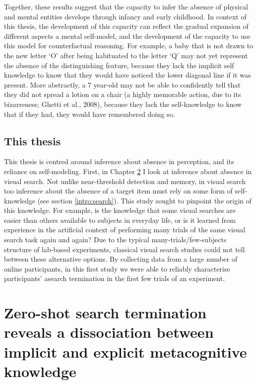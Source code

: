\documentclass[12pt,twoside]{reedthesis}
\begin{document}
Together, these results suggest that the capacity to infer the absence of physical and mental entities develops through infancy and early childhood. In context of this thesis, the development of this capacity can reflect the gradual expansion of different aspects a mental self-model, and the development of the capacity to use this model for counterfactual reasoning. For example, a baby that is not drawn to the new letter `O' after being habituated to the letter `Q' may not yet represent the absence of the distinguishing feature, because they lack the implicit self knowledge to know that they would have noticed the lower diagonal line if it was present. More abstractly, a 7 year-old may not be able to confidently tell that they did not spread a lotion on a chair (a highly memorable action, due to its bizarreness; Ghetti et al., 2008), because they lack the self-knowledge to know that if they had, they would have remembered doing so.

\hypertarget{this-thesis}{%
\section{This thesis}\label{this-thesis}}

This thesis is centred around inference about absence in perception, and its reliance on self-modeling. First, in Chapter \ref{ch:search} I look at inference about absence in visual search. Not unlike near-threshold detection and memory, in visual search too inference about the absence of a target item must rely on some form of self-knowledge (see section \ref{intro:search}). This study sought to pinpoint the origin of this knowledge. For example, is the knowledge that some visual searches are easier than others available to subjects in everyday life, or is it learned from experience in the artificial context of performing many trials of the same visual search task again and again? Due to the typical many-trials/few-subjects structure of lab-based experiments, classical visual search studies could not tell between these alternative options. By collecting data from a large number of online participants, in this first study we were able to reliably characterise participants' asearch termination in the first few trials of an experiment.

\hypertarget{ch:search}{%
\chapter{Zero-shot search termination reveals a dissociation between implicit and explicit metacognitive knowledge}\label{ch:search}}
\end{document}
